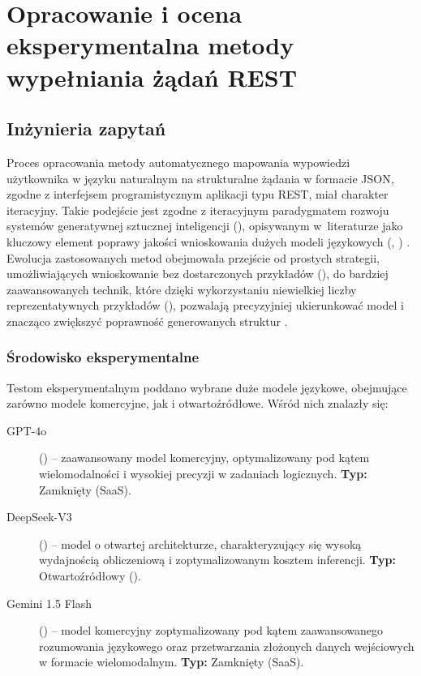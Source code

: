 \chapter{Opracowanie i ocena eksperymentalna metody wypełniania żądań REST} \label{sec:gemini}
\label{chapters:06-gemini}

\section{Inżynieria zapytań}

Proces opracowania metody automatycznego mapowania wypowiedzi użytkownika w języku naturalnym na strukturalne żądania w formacie JSON, zgodne z interfejsem programistycznym aplikacji typu REST, miał charakter iteracyjny. Takie podejście jest zgodne z iteracyjnym paradygmatem rozwoju systemów generatywnej sztucznej inteligencji (), opisywanym w~literaturze jako kluczowy element poprawy jakości wnioskowania dużych modeli językowych (, ) \cite{brown2020language,ouyang2022training}. Ewolucja zastosowanych metod obejmowała przejście od prostych strategii, umożliwiających wnioskowanie bez dostarczonych przykładów (), do bardziej zaawansowanych technik, które dzięki wykorzystaniu niewielkiej liczby reprezentatywnych przykładów (), pozwalają precyzyjniej ukierunkować model i znacząco zwiększyć poprawność generowanych struktur \cite{brown2020language,liu2023pre}.

\subsection{Środowisko eksperymentalne}
\label{subsec:eksperymenty_miary}
Testom eksperymentalnym poddano wybrane duże modele językowe, obejmujące zarówno modele komercyjne, jak i otwartoźródłowe. Wśród nich znalazły się: 
\begin{description}
    \item[GPT-4o] () -- zaawansowany model komercyjny, optymalizowany pod kątem wielomodalności i wysokiej precyzji w zadaniach logicznych. \textbf{Typ:} Zamknięty (SaaS).
    
    \item[DeepSeek-V3] () -- model o otwartej architekturze, charakteryzujący się wysoką wydajnością obliczeniową i zoptymalizowanym kosztem inferencji. \textbf{Typ:} Otwartoźródłowy ().
    
    \item[Gemini 1.5 Flash] () -- model komercyjny zoptymalizowany pod kątem zaawansowanego rozumowania językowego oraz przetwarzania złożonych danych wejściowych w formacie wielomodalnym. \textbf{Typ:} Zamknięty (SaaS).
\end{description}

